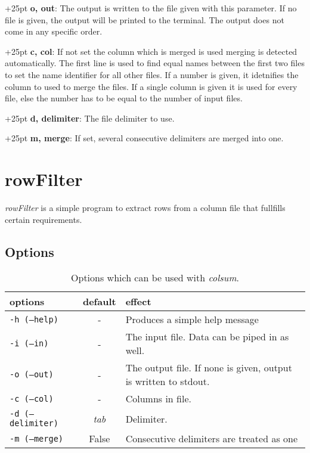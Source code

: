 \documentclass[a4paper,10pt,parskip=half]{scrreprt}
\begin{document}
\hangindent+25pt 
\textbf{o, out}: The output is written to the file given with this parameter. If
no file is given, the output will be printed to the terminal. The output does
not come in any specific order.

\hangindent+25pt 
\textbf{c, col}: If not set the column which is merged is used merging is
detected automatically. The first line is used to find equal names between the
first two files to set the name identifier for all other files. 
If a number is given, it idetnifies the column to used to merge the files. If a single column is given it is used for every file, else the number has to be equal to the number of input files.

\hangindent+25pt 
\textbf{d, delimiter}: The file delimiter to use. 

\hangindent+25pt 
\textbf{m, merge}: If set, several consecutive delimiters are merged into one.



\chapter{rowFilter}


\textit{rowFilter} is a simple program to extract rows from a column file that fullfills certain requirements.

\section{Options}
\begin{table}[h]
\caption{Options which can be used with \textit{colsum}.}
\begin{tabular}{lcp{7cm}}\hline
options& default & effect \\\hline
 \texttt{-h (--help)}&- & Produces a simple help message\\
 \texttt{-i (--in)} &-& The input file. Data can be piped in as well.\\
 \texttt{-o (--out)} &-& The output file. If none is given, output is written to stdout.\\
 \texttt{-c (--col)} &-& Columns in file.\\
 \texttt{-d (--delimiter)} & \textit{tab} & Delimiter. \\
 \texttt{-m (--merge)} & False & Consecutive delimiters are treated as one

\end{tabular}
\end{table}
\end{document}

